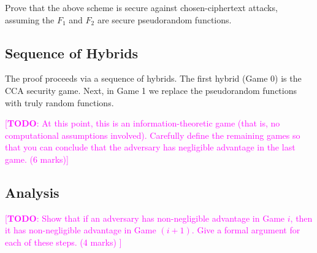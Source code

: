 \documentclass[10pt,addpoints]{exam}
\newcommand{\TODO}[1]{\textcolor{magenta}{[\textbf{TODO}: #1]}}
\theoremstyle{definition}
\begin{document}
        Prove that the above scheme is secure against chosen-ciphertext attacks, assuming the $F_1$ and $F_2$ are secure pseudorandom functions. 

    \color{black}



    \subsection{Sequence of Hybrids}

    The proof proceeds via a sequence of hybrids. The first hybrid (Game 0) is the CCA security game. Next, in Game 1 we replace the pseudorandom functions with truly random functions. 

    \vspace{10pt}

    \noindent\TODO{At this point, this is an information-theoretic game (that is, no computational assumptions involved). Carefully define the remaining games so that you can conclude that the adversary has negligible advantage in the last game. (6 marks)}


    \subsection{Analysis}

    \noindent\TODO{Show that if an adversary has non-negligible advantage in Game $i$, then it has non-negligible advantage in Game $(i+1)$. Give a formal argument for each of these steps. (4 marks) }
\end{document}
